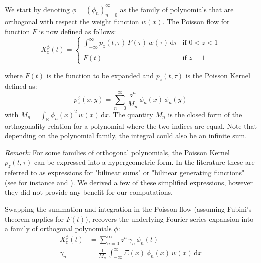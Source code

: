 \documentclass[a4paper,11pt,twoside]{amsart}
\newcommand{\verifiedeq}{=}
\newcommand{\defeq}{=}
\newcommand{\verifiedeq}{\stackrel{\checkmark}{=}}
\newcommand{\defeq}{\stackrel{\scriptscriptstyle \textnormal{def}}{=}}
\begin{document}
We start by denoting $\phi \verifiedeq \left(\phi_n\right)_{n=0}^\infty$ as the family of polynomials that are orthogonal with respect the weight function $w(x)$. The Poisson flow for function $F$ is now defined as follows:
\begin{equation}\label{poiflow}
X^\phi_z(t)\defeq
    \begin{cases}
        \int_{-\infty}^{\infty} p_z(t, \tau)\,F(\tau)\,w(\tau)\,\mathrm{d}\tau & \text{if } 0 < z < 1\\
        \\
        F(t) & \text{if } z = 1
    \end{cases}
\end{equation}

where $F(t)$ is the function to be expanded and $p_z(t, \tau)$ is the Poisson Kernel defined as:
\begin{equation}\label{poiker}
 p^\phi_z(x,y) \defeq \sum_{n=0}^\infty\frac{z^n}{M_n}\, \phi_n(x)\,\phi_n(y)
\end{equation}
with $M_n \verifiedeq \int_\mathbb{R}\phi_n(x)^2\,w(x)\,\mathrm{d}x$. The quantity $M_n$ is the closed form of the orthogonality relation for a polynomial where the two indices are equal. Note that depending on the polynomial family, the integral could also be an infinite sum.

\textit{Remark:} For some families of orthogonal polynomials, the Poisson Kernel $p_z(t, \tau)$ can be expressed into a hypergeometric form. In the literature these are referred to as expressions for "bilinear sums" or "bilinear generating functions" (see for instance \cite{genoverview} and \cite{meipolgen}). We derived a few of these simplified expressions, however they did not provide any benefit for our computations.

Swapping the summation and integration in the Poisson flow (assuming Fubini's theorem applies for $F(t)$), recovers the underlying Fourier series expansion into a family of orthogonal polynomials $\phi$:
\begin{align}
 X^\phi_z(t) &\verifiedeq \sum_{n=0}^\infty z^n\,\gamma_n\,\phi_n(t) \\
 \gamma_n &\verifiedeq \frac{1}{M_n}\,\int_{-\infty}^\infty \Xi(x)\,\phi_n(x)\,w(x) \,\mathrm{d}x
\end{align}
\end{document}

